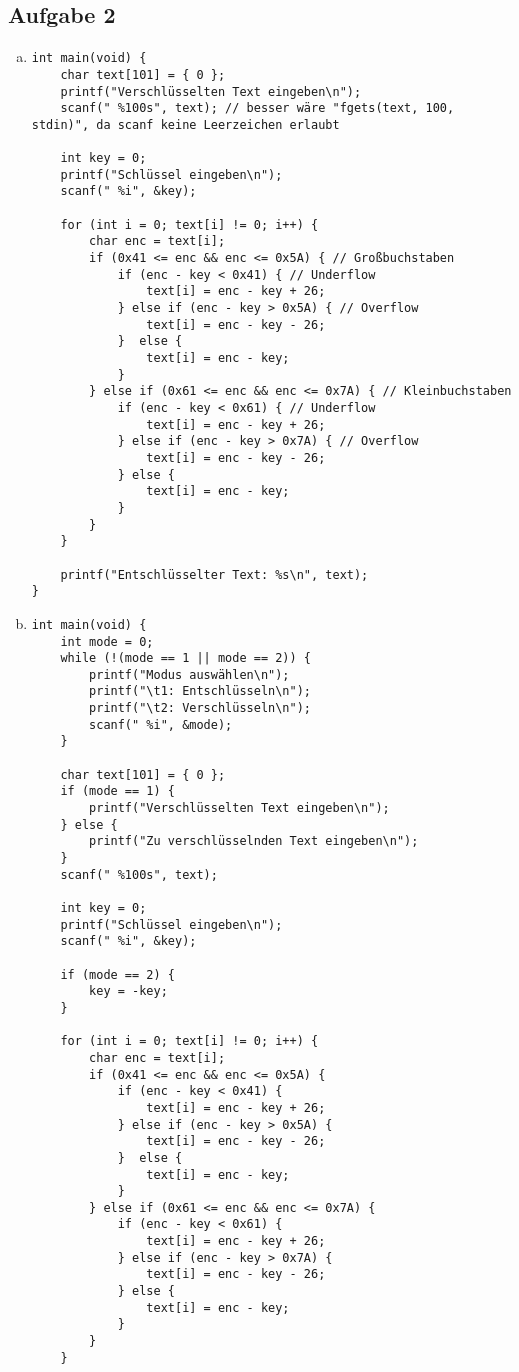 \documentclass{standalone}
\begin{document}
\subsection{Aufgabe 2}
\begin{enumerate}[a)]
\item
    \begin{verbatim}
int main(void) {
    char text[101] = { 0 };
    printf("Verschlüsselten Text eingeben\n");
    scanf(" %100s", text); // besser wäre "fgets(text, 100, stdin)", da scanf keine Leerzeichen erlaubt

    int key = 0;
    printf("Schlüssel eingeben\n");
    scanf(" %i", &key);

    for (int i = 0; text[i] != 0; i++) {
        char enc = text[i];
        if (0x41 <= enc && enc <= 0x5A) { // Großbuchstaben
            if (enc - key < 0x41) { // Underflow
                text[i] = enc - key + 26;
            } else if (enc - key > 0x5A) { // Overflow
                text[i] = enc - key - 26;
            }  else {
                text[i] = enc - key;
            }
        } else if (0x61 <= enc && enc <= 0x7A) { // Kleinbuchstaben
            if (enc - key < 0x61) { // Underflow
                text[i] = enc - key + 26;
            } else if (enc - key > 0x7A) { // Overflow
                text[i] = enc - key - 26;
            } else {
                text[i] = enc - key;
            }
        }
    }

    printf("Entschlüsselter Text: %s\n", text);
}
    \end{verbatim}

\item
    \begin{verbatim}
int main(void) {
    int mode = 0;
    while (!(mode == 1 || mode == 2)) {
        printf("Modus auswählen\n");
        printf("\t1: Entschlüsseln\n");
        printf("\t2: Verschlüsseln\n");
        scanf(" %i", &mode);
    }

    char text[101] = { 0 };
    if (mode == 1) {
        printf("Verschlüsselten Text eingeben\n");
    } else {
        printf("Zu verschlüsselnden Text eingeben\n");
    }
    scanf(" %100s", text);

    int key = 0;
    printf("Schlüssel eingeben\n");
    scanf(" %i", &key);

    if (mode == 2) {
        key = -key;
    }

    for (int i = 0; text[i] != 0; i++) {
        char enc = text[i];
        if (0x41 <= enc && enc <= 0x5A) {
            if (enc - key < 0x41) {
                text[i] = enc - key + 26;
            } else if (enc - key > 0x5A) {
                text[i] = enc - key - 26;
            }  else {
                text[i] = enc - key;
            }
        } else if (0x61 <= enc && enc <= 0x7A) {
            if (enc - key < 0x61) {
                text[i] = enc - key + 26;
            } else if (enc - key > 0x7A) {
                text[i] = enc - key - 26;
            } else {
                text[i] = enc - key;
            }
        }
    }


\end{verbatim}
\end{enumerate}
\end{document}
